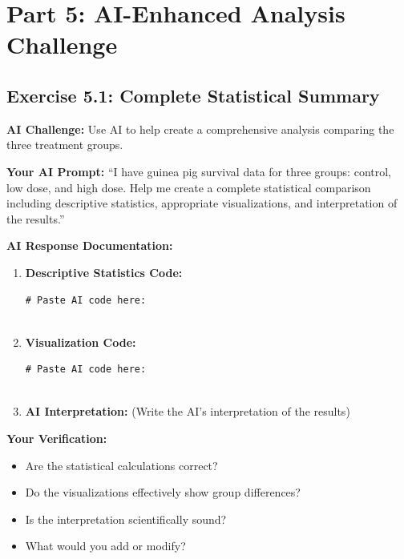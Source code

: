 \documentclass[11pt]{article}
\begin{document}
\section{Part 5: AI-Enhanced Analysis Challenge}

\subsection{Exercise 5.1: Complete Statistical Summary}

\begin{tcolorbox}[colback=aiblue!10,colframe=aiblue,boxrule=1pt,arc=2pt,left=6pt,right=6pt,top=6pt,bottom=6pt]
\textbf{\textcolor{aiblue}{AI Challenge:}} Use AI to help create a comprehensive analysis comparing the three treatment groups.

\textbf{Your AI Prompt:}
``I have guinea pig survival data for three groups: control, low dose, and high dose. Help me create a complete statistical comparison including descriptive statistics, appropriate visualizations, and interpretation of the results.''
\end{tcolorbox}

\textbf{AI Response Documentation:}
\begin{enumerate}
\item \textbf{Descriptive Statistics Code:}
\begin{lstlisting}
# Paste AI code here:


\end{lstlisting}

\item \textbf{Visualization Code:}
\begin{lstlisting}
# Paste AI code here:


\end{lstlisting}

\item \textbf{AI Interpretation:}
(Write the AI's interpretation of the results)

\vspace{3cm}

\end{enumerate}

\textbf{Your Verification:}
\begin{itemize}
\item[$\square$] Are the statistical calculations correct?
\item[$\square$] Do the visualizations effectively show group differences?
\item[$\square$] Is the interpretation scientifically sound?
\item[$\square$] What would you add or modify?
\end{itemize}
\end{document}
